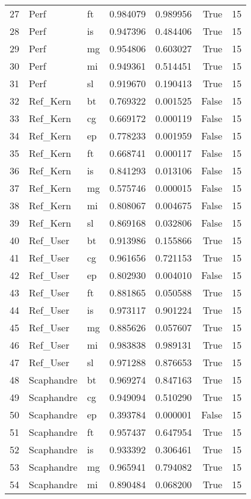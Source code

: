 \begin{tabular}{lllrrrr}
27 & Perf & ft & 0.984079 & 0.989956 & True & 15 \\
28 & Perf & is & 0.947396 & 0.484406 & True & 15 \\
29 & Perf & mg & 0.954806 & 0.603027 & True & 15 \\
30 & Perf & mi & 0.949361 & 0.514451 & True & 15 \\
31 & Perf & sl & 0.919670 & 0.190413 & True & 15 \\
32 & Ref_Kern & bt & 0.769322 & 0.001525 & False & 15 \\
33 & Ref_Kern & cg & 0.669172 & 0.000119 & False & 15 \\
34 & Ref_Kern & ep & 0.778233 & 0.001959 & False & 15 \\
35 & Ref_Kern & ft & 0.668741 & 0.000117 & False & 15 \\
36 & Ref_Kern & is & 0.841293 & 0.013106 & False & 15 \\
37 & Ref_Kern & mg & 0.575746 & 0.000015 & False & 15 \\
38 & Ref_Kern & mi & 0.808067 & 0.004675 & False & 15 \\
39 & Ref_Kern & sl & 0.869168 & 0.032806 & False & 15 \\
40 & Ref_User & bt & 0.913986 & 0.155866 & True & 15 \\
41 & Ref_User & cg & 0.961656 & 0.721153 & True & 15 \\
42 & Ref_User & ep & 0.802930 & 0.004010 & False & 15 \\
43 & Ref_User & ft & 0.881865 & 0.050588 & True & 15 \\
44 & Ref_User & is & 0.973117 & 0.901224 & True & 15 \\
45 & Ref_User & mg & 0.885626 & 0.057607 & True & 15 \\
46 & Ref_User & mi & 0.983838 & 0.989131 & True & 15 \\
47 & Ref_User & sl & 0.971288 & 0.876653 & True & 15 \\
48 & Scaphandre & bt & 0.969274 & 0.847163 & True & 15 \\
49 & Scaphandre & cg & 0.949094 & 0.510290 & True & 15 \\
50 & Scaphandre & ep & 0.393784 & 0.000001 & False & 15 \\
51 & Scaphandre & ft & 0.957437 & 0.647954 & True & 15 \\
52 & Scaphandre & is & 0.933392 & 0.306461 & True & 15 \\
53 & Scaphandre & mg & 0.965941 & 0.794082 & True & 15 \\
54 & Scaphandre & mi & 0.890484 & 0.068200 & True & 15 \\

\end{tabular}
